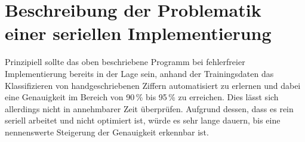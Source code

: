 \documentclass[../main.tex]{subfiles}
\begin{document}
\section{Beschreibung der Problematik einer seriellen Implementierung}
Prinzipiell sollte das oben beschriebene Programm bei fehlerfreier Implementierung bereits in der Lage sein, anhand der Trainingsdaten das Klassifizieren von handgeschriebenen Ziffern automatisiert zu erlernen und dabei eine Genauigkeit im Bereich von 90\,\% bis 95\,\% zu erreichen. Dies lässt sich allerdings nicht in annehmbarer Zeit überprüfen. Aufgrund dessen, dass es rein seriell arbeitet und nicht optimiert ist, würde es sehr lange dauern, bis eine nennenswerte Steigerung der Genauigkeit erkennbar ist. 
\end{document}
